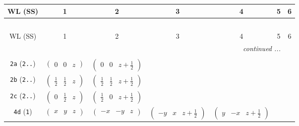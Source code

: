 \documentclass[fleqn,9pt,landscape]{jsarticle}
\begin{document}
\begin{center}
\renewcommand{\arraystretch}{1.2}
\begin{longtable}{ccccccc}
 \hline \hline
WL (SS) & 1 & 2 & 3 & 4 & 5 & 6 \\ \hline \endfirsthead

\multicolumn{6}{l}{\tablename\ \thetable{}} \\
 \hline \hline
WL (SS) & 1 & 2 & 3 & 4 & 5 & 6 \\ \hline \endhead

 \hline \hline
\multicolumn{6}{r}{\footnotesize\it continued ...} \\ \endfoot

 \hline \hline
\multicolumn{6}{r}{} \\ \endlastfoot

{\tt 2a} ({\tt 2..}) & $ \begin{pmatrix} 0 & 0 & z \end{pmatrix} $ & $ \begin{pmatrix} 0 & 0 & z + \frac{1}{2} \end{pmatrix} $ & $  $ & $  $ \\ \hline
{\tt 2b} ({\tt 2..}) & $ \begin{pmatrix} \frac{1}{2} & \frac{1}{2} & z \end{pmatrix} $ & $ \begin{pmatrix} \frac{1}{2} & \frac{1}{2} & z + \frac{1}{2} \end{pmatrix} $ & $  $ & $  $ \\ \hline
{\tt 2c} ({\tt 2..}) & $ \begin{pmatrix} 0 & \frac{1}{2} & z \end{pmatrix} $ & $ \begin{pmatrix} \frac{1}{2} & 0 & z + \frac{1}{2} \end{pmatrix} $ & $  $ & $  $ \\ \hline
{\tt 4d} ({\tt 1}) & $ \begin{pmatrix} x & y & z \end{pmatrix} $ & $ \begin{pmatrix} - x & - y & z \end{pmatrix} $ & $ \begin{pmatrix} - y & x & z + \frac{1}{2} \end{pmatrix} $ & $ \begin{pmatrix} y & - x & z + \frac{1}{2} \end{pmatrix} $ \\
\end{longtable}
\end{center}
\end{document}
